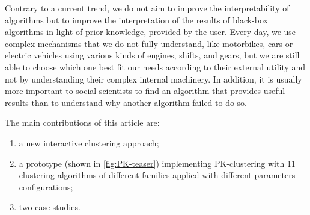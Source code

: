 Contrary to a current trend\cite{molnar2019}, we do not aim to improve the interpretability of algorithms but to improve the interpretation of the results of black-box algorithms in light of prior knowledge, provided by the user.  Every day, we use complex mechanisms that we do not fully understand, like motorbikes, cars or electric vehicles using various kinds of engines, shifts, and gears, but we are still able to choose which one best fit our needs according to their external utility and not by understanding their complex internal machinery. In addition, it is usually more important to social scientists to find an algorithm that provides useful results than to understand why another algorithm failed to do so.

The main contributions of this article are:
\begin{enumerate}[left=0pt .. \parindent,nosep]
\item a new interactive clustering approach;
\item a prototype (shown in \autoref{fig:PK-teaser}) implementing PK-clustering with 11 clustering algorithms of different families applied with different parameters configurations;
\item two case studies.
\end{enumerate}

